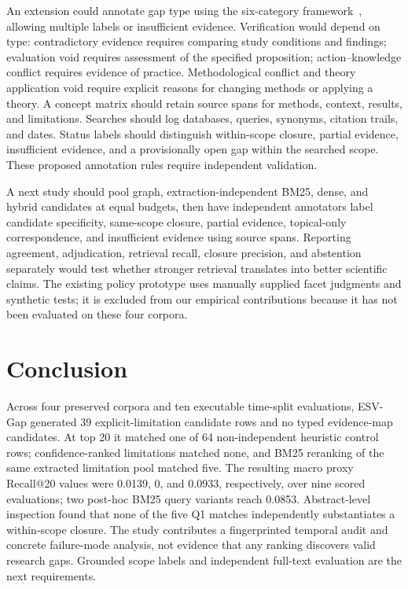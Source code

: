 \documentclass[conference,a4paper]{IEEEtran}
\begin{document}
An extension could annotate gap type using the six-category framework~\cite{mullerbloch2015}, allowing multiple labels or insufficient evidence. Verification would depend on type: contradictory evidence requires comparing study conditions and findings; evaluation void requires assessment of the specified proposition; action--knowledge conflict requires evidence of practice. Methodological conflict and theory application void require explicit reasons for changing methods or applying a theory. A concept matrix should retain source spans for methods, context, results, and limitations. Searches should log databases, queries, synonyms, citation trails, and dates. Status labels should distinguish within-scope closure, partial evidence, insufficient evidence, and a provisionally open gap within the searched scope. These proposed annotation rules require independent validation.

A next study should pool graph, extraction-independent BM25, dense, and hybrid candidates at equal budgets, then have independent annotators label candidate specificity, same-scope closure, partial evidence, topical-only correspondence, and insufficient evidence using source spans. Reporting agreement, adjudication, retrieval recall, closure precision, and abstention separately would test whether stronger retrieval translates into better scientific claims. The existing policy prototype uses manually supplied facet judgments and synthetic tests; it is excluded from our empirical contributions because it has not been evaluated on these four corpora.

\section{Conclusion}
Across four preserved corpora and ten executable time-split evaluations, ESV-Gap generated 39 explicit-limitation candidate rows and no typed evidence-map candidates. At top 20 it matched one of 64 non-independent heuristic control rows; confidence-ranked limitations matched none, and BM25 reranking of the same extracted limitation pool matched five. The resulting macro proxy Recall@20 values were 0.0139, 0, and 0.0933, respectively, over nine scored evaluations; two post-hoc BM25 query variants reach 0.0853. Abstract-level inspection found that none of the five Q1 matches independently substantiates a within-scope closure. The study contributes a fingerprinted temporal audit and concrete failure-mode analysis, not evidence that any ranking discovers valid research gaps. Grounded scope labels and independent full-text evaluation are the next requirements.
\end{document}
